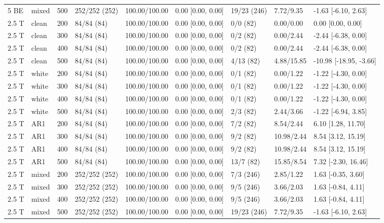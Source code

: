 \documentclass[10pt]{article}
\begin{document}
\begin{longtable}{@{}lllllllll@{}}
5 BE & mixed & 500 & 252/252 (252) & 100.00/100.00 & 0.00 [0.00, 0.00] & 19/23 (246) & 7.72/9.35 & -1.63 [-6.10, 2.63] \\
2.5 T & clean & 200 & 84/84 (84) & 100.00/100.00 & 0.00 [0.00, 0.00] & 0/0 (82) & 0.00/0.00 & 0.00 [0.00, 0.00] \\
2.5 T & clean & 300 & 84/84 (84) & 100.00/100.00 & 0.00 [0.00, 0.00] & 0/2 (82) & 0.00/2.44 & -2.44 [-6.38, 0.00] \\
2.5 T & clean & 400 & 84/84 (84) & 100.00/100.00 & 0.00 [0.00, 0.00] & 0/2 (82) & 0.00/2.44 & -2.44 [-6.38, 0.00] \\
2.5 T & clean & 500 & 84/84 (84) & 100.00/100.00 & 0.00 [0.00, 0.00] & 4/13 (82) & 4.88/15.85 & -10.98 [-18.95, -3.66] \\
2.5 T & white & 200 & 84/84 (84) & 100.00/100.00 & 0.00 [0.00, 0.00] & 0/1 (82) & 0.00/1.22 & -1.22 [-4.30, 0.00] \\
2.5 T & white & 300 & 84/84 (84) & 100.00/100.00 & 0.00 [0.00, 0.00] & 0/1 (82) & 0.00/1.22 & -1.22 [-4.30, 0.00] \\
2.5 T & white & 400 & 84/84 (84) & 100.00/100.00 & 0.00 [0.00, 0.00] & 0/1 (82) & 0.00/1.22 & -1.22 [-4.30, 0.00] \\
2.5 T & white & 500 & 84/84 (84) & 100.00/100.00 & 0.00 [0.00, 0.00] & 2/3 (82) & 2.44/3.66 & -1.22 [-6.94, 3.85] \\
2.5 T & AR1 & 200 & 84/84 (84) & 100.00/100.00 & 0.00 [0.00, 0.00] & 7/2 (82) & 8.54/2.44 & 6.10 [1.28, 11.70] \\
2.5 T & AR1 & 300 & 84/84 (84) & 100.00/100.00 & 0.00 [0.00, 0.00] & 9/2 (82) & 10.98/2.44 & 8.54 [3.12, 15.19] \\
2.5 T & AR1 & 400 & 84/84 (84) & 100.00/100.00 & 0.00 [0.00, 0.00] & 9/2 (82) & 10.98/2.44 & 8.54 [3.12, 15.19] \\
2.5 T & AR1 & 500 & 84/84 (84) & 100.00/100.00 & 0.00 [0.00, 0.00] & 13/7 (82) & 15.85/8.54 & 7.32 [-2.30, 16.46] \\
2.5 T & mixed & 200 & 252/252 (252) & 100.00/100.00 & 0.00 [0.00, 0.00] & 7/3 (246) & 2.85/1.22 & 1.63 [-0.35, 3.60] \\
2.5 T & mixed & 300 & 252/252 (252) & 100.00/100.00 & 0.00 [0.00, 0.00] & 9/5 (246) & 3.66/2.03 & 1.63 [-0.84, 4.11] \\
2.5 T & mixed & 400 & 252/252 (252) & 100.00/100.00 & 0.00 [0.00, 0.00] & 9/5 (246) & 3.66/2.03 & 1.63 [-0.84, 4.11] \\
2.5 T & mixed & 500 & 252/252 (252) & 100.00/100.00 & 0.00 [0.00, 0.00] & 19/23 (246) & 7.72/9.35 & -1.63 [-6.10, 2.63] \\
\bottomrule\end{longtable}\endgroup
\end{document}

